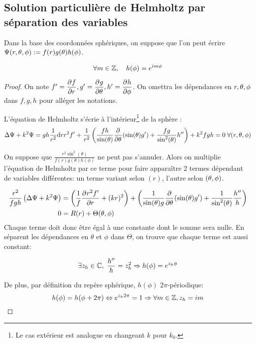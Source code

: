 \subsection{Solution particulière de Helmholtz par séparation des variables}
\begin{hyp}
Dans la base des coordonnées sphériques, on suppose que l'on peut écrire $\Psi(\rtp) : = f(r)g(\theta)h(\phi)$. 
\end{hyp}
\begin{prop}
\begin{equation}
\forall m \in \ZZ, \quad h(\phi) = e^{im\phi}
\end{equation}
\end{prop}
\begin{proof}
On note $f' =\ddr{r}{f}, g' = \ddr{\theta}{g} , h' = \ddr{\phi}{h}$. On omettra les dépendances en $\rtp$ dans $f,g,h$ pour alléger les notations.

L'équation de Helmholtz s'écrie à l'intérieur\footnote{Le cas extérieur est analogue en changeant $k$ pour $k_0$.} de la sphère : 
\begin{equation}\label{eq:helm:helm}
  \Delta \Psi + k^2 \Psi = gh\frac{1}{r^2}\dd{r}{r^2f'} + \frac{1}{r^2}\left(\frac{fh}{\sin(\theta)}\ddr{\theta}{}(\sin(\theta)g')+\frac{fg}{\sin^2(\theta)}h''\right) + k^2 fgh = 0 \; \forall (r,\tp)
\end{equation}

On suppose que $ \frac{r^2\sin^2(\theta)}{f(r)g(\theta)h(\phi)}$ ne peut pas s'annuler. Alors on multiplie l'équation de Helmholtz par ce terme pour faire apparaître 2 termes dépendant de variables différentes: un terme variant selon $(r)$, l'autre selon $(\tp)$. 

\begin{align*}
\frac{r^2}{fgh} \left(\Delta \Psi + k^2 \Psi\right) &= 
\left(\frac{1}{f}\ddr{r}{r^2f'} + (kr)^2\right) + 
\left(\frac{1}{ \sin(\theta)g} \ddr{\theta}{}(\sin(\theta)g') +  \frac{1}{ \sin^2(\theta)}\frac{h''}{h} \right)\\
0 &=R(r) + \Theta(\tp)
\end{align*}
Chaque terme doit donc être égal à une constante dont le somme sera nulle. En séparent les dépendances en $\theta$ et $\phi$ dans $\Theta$, on trouve que chaque terme est aussi constant:

\[ 
\exists z_h \in \CC,\; \frac{h''}{h} = z_h^2 \Rightarrow h(\phi) = e^{z_h\phi}
\]

De plus, par définition du repère sphérique, $h(\phi)$ $2\pi$-périodique:
\[
h(\phi) = h(\phi + 2\pi) \Leftrightarrow e^{z_h2\pi}= 1 \Rightarrow \forall m \in \ZZ, z_h = im
\]
\end{proof}

